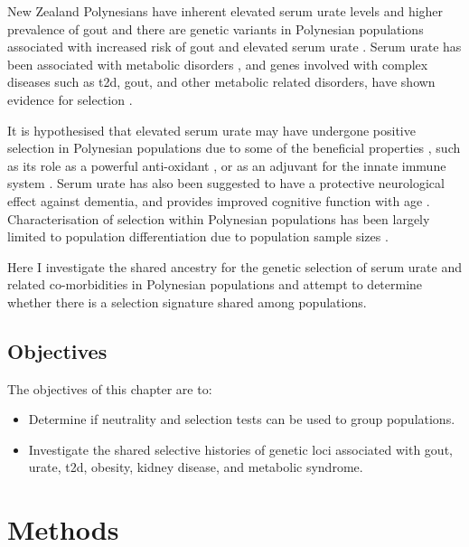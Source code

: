 \documentclass[]{report}
\providecommand{\tightlist}{%
  \setlength{\itemsep}{0pt}\setlength{\parskip}{0pt}}
\begin{document}
New Zealand Polynesians have inherent elevated serum urate levels and
higher prevalence of gout \citep{Winnard2012, Winnard2013} and there are
genetic variants in Polynesian populations associated with increased
risk of gout and elevated serum urate
\citep{Phipps-Green2010, Phipps-Green2016}. Serum urate has been
associated with metabolic disorders \citep{Choi2007, Choi2007b}, and
genes involved with complex diseases such as \gls{t2d}, gout, and other
metabolic related disorders, have shown evidence for selection
\citep{Zhang2013a, pickrell2009signals, Hancock2008}.

It is hypothesised that elevated serum urate may have undergone positive
selection in Polynesian populations due to some of the beneficial
properties \citep{Gosling2014}, such as its role as a powerful
anti-oxidant \citep{Ames1981}, or as an adjuvant for the innate immune
system \citep{Opitz2009}. Serum urate has also been suggested to have a
protective neurological effect against dementia, and provides improved
cognitive function with age \citep{Euser2009}. Characterisation of
selection within Polynesian populations has been largely limited to
population differentiation due to population sample sizes
\citep{Kimura2008, Mallick2016}.

Here I investigate the shared ancestry for the genetic selection of
serum urate and related co-morbidities in Polynesian populations and
attempt to determine whether there is a selection signature shared among
populations.

\subsection{Objectives}\label{objectives-1}

The objectives of this chapter are to:

\begin{itemize}
\tightlist
\item
  Determine if neutrality and selection tests can be used to group
  populations.
\item
  Investigate the shared selective histories of genetic loci associated
  with gout, urate, \gls{t2d}, obesity, kidney disease, and metabolic
  syndrome.
\end{itemize}

\section{Methods}\label{methods-1}
\end{document}
